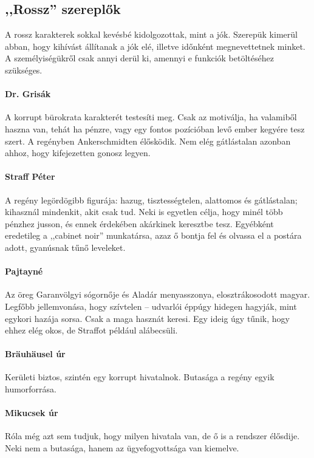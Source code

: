 \documentclass{thesis-ekf}
\begin{document}
    \subsection{,,Rossz'' szereplők}
    A rossz karakterek sokkal kevésbé kidolgozottak, mint a jók.
    Szerepük kimerül abban, hogy kihívást állítanak a jók elé, illetve időnként megnevettetnek minket.
    A személyiségükről csak annyi derül ki, amennyi e funkciók betöltéséhez szükséges.

    \paragraph{Dr. Grisák}
    A korrupt bürokrata karakterét testesíti meg.
    Csak az motiválja, ha valamiből haszna van, tehát ha pénzre, vagy egy fontos pozícióban levő ember kegyére tesz szert.
    A regényben Ankerschmidten élősködik.
    Nem elég gátlástalan azonban ahhoz, hogy kifejezetten gonosz legyen.

    \paragraph{Straff Péter}
    A regény legördögibb figurája: hazug, tisztességtelen, alattomos és gátlástalan; kihasznál mindenkit, akit csak tud.
    Neki is egyetlen célja, hogy minél több pénzhez jusson, és ennek érdekében akárkinek keresztbe tesz.
    Egyébként eredetileg a ,,cabinet noir'' munkatársa, azaz ő bontja fel és olvassa el a postára adott, gyanúsnak tűnő leveleket.

    \paragraph{Pajtayné}
    Az öreg Garanvölgyi sógornője és Aladár menyasszonya, elosztrákosodott magyar.
    Legfőbb jellemvonása, hogy szívtelen – udvarlói éppúgy hidegen hagyják, mint egykori hazája sorsa.
    Csak a maga hasznát keresi.
    Egy ideig úgy tűnik, hogy ehhez elég okos, de Straffot például alábecsüli.

    \paragraph{Bräuhäusel úr}
    Kerületi biztos, szintén egy korrupt hivatalnok.
    Butasága a regény egyik humorforrása.

    \paragraph{Mikucsek úr}
    Róla még azt sem tudjuk, hogy milyen hivatala van, de ő is a rendszer élősdije.
    Neki nem a butasága, hanem az ügyefogyottsága van kiemelve.
\end{document}
